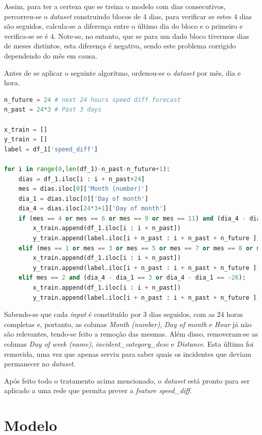 \documentclass[a4paper, 12pt]{article}
\begin{document}
Assim, para ter a certeza que se treina o modelo com dias consecutivos, percorreu-se o \textit{dataset} construindo blocos de $4$ dias, para verificar se estes $4$ dias são seguidos, calcula-se a diferença entre o último dia do bloco e o primeiro e verifica-se se é $4$. Note-se, no entanto, que se para um dado bloco tivermos dias de meses distintos, esta diferença é negativa, sendo este problema corrigido dependendo do mês em causa.

Antes de se aplicar o seguinte algoritmo, ordenou-se o \textit{dataset} por mês, dia e hora.

\begin{lstlisting}[language=Python]
n_future = 24 # next 24 hours speed diff forecast
n_past = 24*3 # Past 3 days

x_train = []
y_train = []
label = df_1['speed_diff']

for i in range(0,len(df_1)-n_past-n_future+1):
	dias = df_1.iloc[i : i + n_past+24]
	mes = dias.iloc[0]['Month (number)']
	dia_1 = dias.iloc[0]['Day of month']
	dia_4 = dias.iloc[24*3+1]['Day of month']
	if (mes == 4 or mes == 6 or mes == 9 or mes == 11) and (dia_4 - dia_1 == 3 or dia_4 - dia_1 == -29):
		x_train.append(df_1.iloc[i : i + n_past])
		y_train.append(label.iloc[i + n_past : i + n_past + n_future ])
	elif (mes == 1 or mes == 3 or mes == 5 or mes == 7 or mes == 8 or mes == 10 or mes == 12) and (dia_4 - dia_1 == 3 or dia_4 - dia_1 == -28):
		x_train.append(df_1.iloc[i : i + n_past])
		y_train.append(label.iloc[i + n_past : i + n_past + n_future ])
	elif mes == 2 and (dia_4 - dia_1 == 3 or dia_4 - dia_1 == -26):
		x_train.append(df_1.iloc[i : i + n_past])
		y_train.append(label.iloc[i + n_past : i + n_past + n_future ])
\end{lstlisting}

Sabendo-se que cada \textit{input} é constituído por $3$ dias seguidos, com as $24$ horas completas e, portanto, as colunas \textit{Month (number)}, \textit{Day of month} e \textit{Hour} já não são relevantes, tendo-se feito a remoção das mesmas. Além disso, removeram-se as colunas \textit{Day of week (name)}, \textit{incident\_category\_desc} e \textit{Distance}. Esta última foi removida, uma vez que apenas serviu para saber quais os incidentes que deviam permanecer no \textit{dataset}.

Após feito todo o tratamento acima mencionado, o \textit{dataset} está pronto para ser aplicado a uma rede que permita prever a \textit{feature speed\_diff}.

\section{Modelo}
\end{document}
